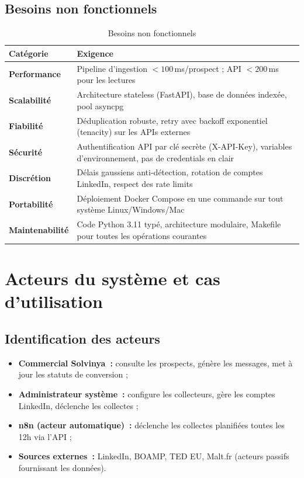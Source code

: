 \subsection{Besoins non fonctionnels}

\begin{table}[H]
  \centering
  \begin{tabular}{L{3.5cm} L{9cm}}
    \toprule
    \textbf{Catégorie} & \textbf{Exigence} \\
    \midrule
    \textbf{Performance} & Pipeline d'ingestion $< 100$\,ms/prospect ; API $< 200$\,ms pour les lectures \\
    \addlinespace
    \textbf{Scalabilité} & Architecture stateless (FastAPI), base de données indexée, pool asyncpg \\
    \addlinespace
    \textbf{Fiabilité} & Déduplication robuste, retry avec backoff exponentiel (tenacity) sur les APIs externes \\
    \addlinespace
    \textbf{Sécurité} & Authentification API par clé secrète (X-API-Key), variables d'environnement, pas de credentials en clair \\
    \addlinespace
    \textbf{Discrétion} & Délais gaussiens anti-détection, rotation de comptes LinkedIn, respect des rate limits \\
    \addlinespace
    \textbf{Portabilité} & Déploiement Docker Compose en une commande sur tout système Linux/Windows/Mac \\
    \addlinespace
    \textbf{Maintenabilité} & Code Python 3.11 typé, architecture modulaire, Makefile pour toutes les opérations courantes \\
    \bottomrule
  \end{tabular}
  \caption{Besoins non fonctionnels}
  \label{tab:bnf}
\end{table}

\section{Acteurs du système et cas d'utilisation}

\subsection{Identification des acteurs}

\begin{itemize}
  \item \textbf{Commercial Solvinya~:} consulte les prospects, génère les messages,
        met à jour les statuts de conversion ;
  \item \textbf{Administrateur système~:} configure les collecteurs, gère les comptes
        LinkedIn, déclenche les collectes ;
  \item \textbf{n8n (acteur automatique)~:} déclenche les collectes planifiées toutes
        les 12h via l'API ;
  \item \textbf{Sources externes~:} LinkedIn, BOAMP, TED EU, Malt.fr (acteurs passifs
        fournissant les données).
\end{itemize}


